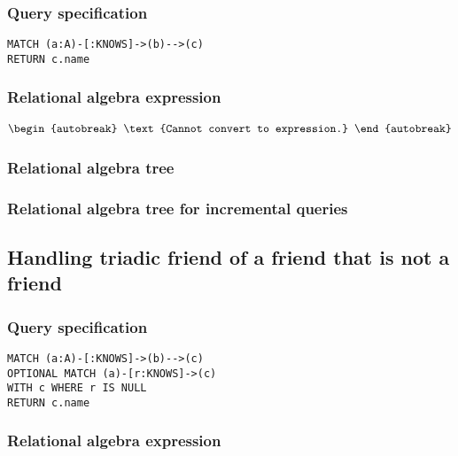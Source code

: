 \subsubsection*{Query specification}

\begin{lstlisting}
MATCH (a:A)-[:KNOWS]->(b)-->(c)
RETURN c.name
\end{lstlisting}

\subsubsection*{Relational algebra expression}

\begin{align*}
\begin{autobreak}
\text{Cannot convert to expression.}
\end{autobreak}
\end{align*}

\subsubsection*{Relational algebra tree}


\subsubsection*{Relational algebra tree for incremental queries}


\subsection{Handling triadic friend of a friend that is not a friend}

\subsubsection*{Query specification}

\begin{lstlisting}
MATCH (a:A)-[:KNOWS]->(b)-->(c)
OPTIONAL MATCH (a)-[r:KNOWS]->(c)
WITH c WHERE r IS NULL
RETURN c.name
\end{lstlisting}

\subsubsection*{Relational algebra expression}

